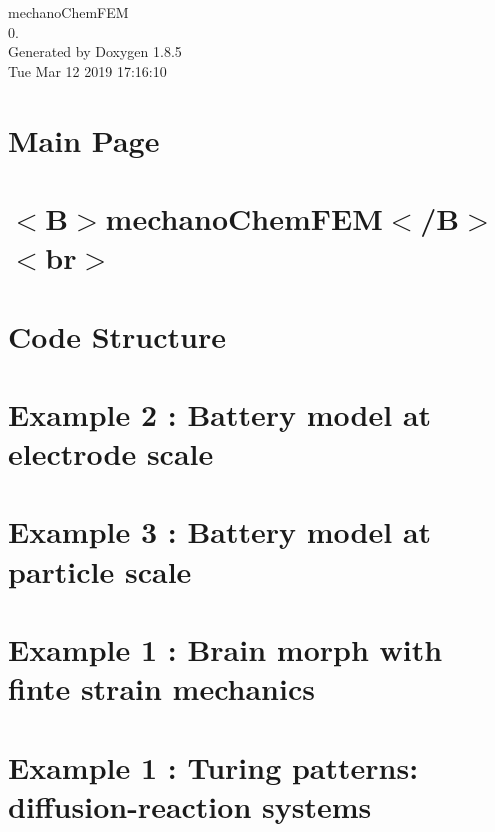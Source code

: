 \documentclass[twoside]{book}
\newcommand{\clearemptydoublepage}{%
  \newpage{\pagestyle{empty}\cleardoublepage}%
}
\begin{document}
\begin{titlepage}
\vspace*{7cm}
\begin{center}%
{\Large mechano\-Chem\-F\-E\-M \\[1ex]\large 0. }\\
\vspace*{1cm}
{\large Generated by Doxygen 1.8.5}\\
\vspace*{0.5cm}
{\small Tue Mar 12 2019 17:16:10}\\
\end{center}
\end{titlepage}
\clearemptydoublepage
\tableofcontents
\clearemptydoublepage
{}

\chapter{Main Page}
\label{index}\hypertarget{index}{}
\chapter{$<$B$>$mechano\-Chem\-F\-E\-M$<$/\-B$>$$<$br$>$}
\label{md_doxygen_readme}

\chapter{Code Structure}
\label{codestructure}

\chapter{Example 2 \-: Battery model at electrode scale}
\label{battery_electrode_scale}

\chapter{Example 3 \-: Battery model at particle scale}
\label{battery_particle}

\chapter{Example 1 \-: Brain morph with finte strain mechanics}
\label{brain_morph}

\chapter{Example 1 \-: Turing patterns\-: diffusion-\/reaction systems}
\label{diffusion_reaction}

\end{document}

